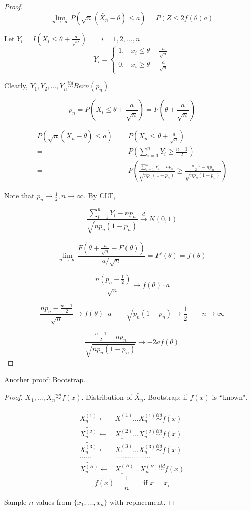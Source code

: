 \begin{proof}
\[\lim_{n \to\infty} P(\sqrt{n}(\tilde{X_n}-\theta)\leq a)=P(Z \leq 2 f(\theta)a)\]

Let $Y_i=I\left(X_i\leq \theta+\frac{a}{\sqrt{n}}\right) \qquad i=1,2,\dots,n$
\[Y_i=\begin{cases}
1, & x_i\leq \theta+\frac{a}{\sqrt{n}} \\
0. & x_i\geq \theta+\frac{a}{\sqrt{n}} 
\end{cases}\]

Clearly, $Y_1,Y_2,\dots,Y_n \overset{iid}{\sim} Bern(p_n)$

\[p_n=P\left(X_i\leq \theta+\frac{a}{\sqrt{n}}\right)=F\left( \theta+\frac{a}{\sqrt{n}}\right)\]

\begin{align*}
P(\sqrt{n}(\tilde{X_n}-\theta)\leq a)= & P\left(\tilde{X_n}\leq \theta+\frac{a}{\sqrt{n}}\right)\\
= & P\left( \sum_{i=1}^{n} Y_i \geq \frac{n+1}{2} \right) \\
= & P\left(\frac{\sum_{i=1}^{n} Y_i -n p_n}{\sqrt{n p_n(1-p_n)}} \geq \frac{\frac{n+1}{2} -n p_n}{\sqrt{n p_n(1-p_n)}}\right)
\end{align*}

Note that $p_n \to\frac{1}{2}, n\to \infty$. By CLT,

\[ \frac{\sum_{i=1}^{n} Y_i -n p_n}{\sqrt{n p_n(1-p_n)}}  \overset{d}{\to} N(0,1)\]

\[\lim_{n\to\infty} \frac{F\left(\theta+\frac{a}{\sqrt{n}}-F(\theta)\right)}{a/\sqrt{n}}=F'(\theta)=f(\theta)\]

\[\frac{n\left(p_n-\frac{1}{2}\right)}{\sqrt{n}} \longrightarrow f(\theta)\cdot a\]

\[\frac{np_n-\frac{n+1}{2}}{\sqrt{n}} \longrightarrow f(\theta)\cdot a \qquad \sqrt{p_n(1-p_n)} \longrightarrow \frac{1}{2} \qquad n\to\infty\]

\[\frac{\frac{n+1}{2} -n p_n}{\sqrt{n p_n(1-p_n)}}\longrightarrow -2af(\theta)\]
\end{proof}

Another proof: Bootstrap.
\begin{proof}
$X_1,\dots,X_n \overset{iid}{\sim} f(x)$. Distribution of $\tilde{X_n}$. Bootstrap: if $f(x)$ is ``known".

\begin{align*}
\tilde{X_n^{(1)}} \leftarrow & X_1^{(1)} \dots X_n^{(1)} \overset{iid}{\sim} f(x)  \\
\tilde{X_n^{(2)}} \leftarrow & X_1^{(2)} \dots X_n^{(2)} \overset{iid}{\sim} f(x)  \\
\tilde{X_n^{(3)}} \leftarrow & X_1^{(3)} \dots X_n^{(3)} \overset{iid}{\sim} f(x)  \\
\dots\dots & \dots\dots\dots\dots\dots\dots \\
\tilde{X_n^{(B)}} \leftarrow & X_1^{(B)} \dots X_n^{(B)} \overset{iid}{\sim} f(x)  
\end{align*}
\[\tilde{f(x)}=\frac{1}{n} \qquad \text{if } x=x_i\]

Sample $n$ values from $\{x_1,\dots,x_n\}$ with replacement.
\end{proof}